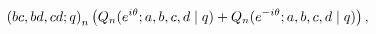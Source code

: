 \[\left(bc,bd,cd;q\right)_{n}\*\left(Q_{n}(e^{i\theta};a,b,c,d\mid q)+Q_{n}(e^{-%
i\theta};a,b,c,d\mid q)\right),\]